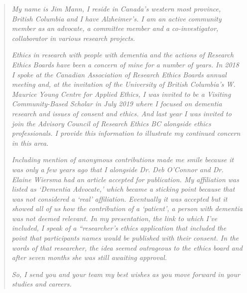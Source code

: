 \begin{quote}
\textit{My name is Jim Mann, I reside in Canada’s western most province, British Columbia and I have Alzheimer's. I am an active community member as an advocate, a committee member and a co-investigator, collaborator in various research projects.} 

\textit{Ethics in research with people with dementia and the actions of Research Ethics Boards have been a concern of mine for a number of years. In 2018 I spoke at the Canadian Association of Research Ethics Boards annual meeting and, at the invitation of the University of British Columbia’s W. Maurice Young Centre for Applied Ethics, I was invited to be a Visiting Community-Based Scholar in July 2019 where I focused on dementia research and issues of consent and ethics. And last year I was invited to join the Advisory Council of Research Ethics BC alongside ethics professionals. I provide this information to illustrate my continued concern in this area.
} 

\textit{Including mention of anonymous contributions made me smile because it was only a few years ago that I alongside Dr. Deb O’Connor and Dr. Elaine Wiersma had an article accepted for publication. My affiliation was listed as ‘Dementia Advocate,’ which became a sticking point because that was not considered a ‘real’ affiliation. Eventually it was accepted but it showed all of us how the contribution of a ‘patient’, a person with dementia was not deemed relevant. In my presentation, the link to which I’ve included, I speak of a “researcher’s ethics application that included the point that participants names would be published with their consent. In the words of that researcher, the idea seemed outrageous to the ethics board and after seven months she was still awaiting approval.
} 

\textit{So, I send you and your team my best wishes as you move forward in your studies and careers.
}
\end{quote}
